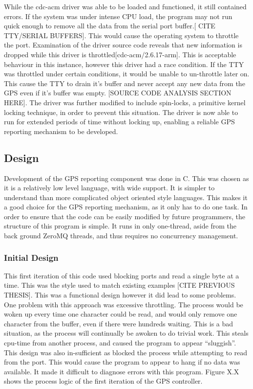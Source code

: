 While the cdc-acm driver was able to be loaded and functioned, it still contained errors. If the system was under intense CPU load, the program may not run quick enough to remove all the data from the serial port buffer.[ CITE TTY/SERIAL BUFFERS]. This would cause the operating system to throttle the port. Examination of the driver source code reveals that new information is dropped while this driver is throttled[cdc-acm/2.6.17-arm]. This is acceptable behaviour in this instance, however this driver had a race condition. If the TTY was throttled under certain conditions, it would be unable to un-throttle later on. This cause the TTY to drain it’s buffer and never accept any new data from the GPS even if it’s buffer was empty. [SOURCE CODE ANALYSIS SECTION HERE]. The driver was further modified to include spin-locks, a primitive kernel locking technique, in order to prevent this situation. The driver is now able to run for extended periods of time without locking up, enabling a reliable GPS reporting mechanism to be developed. 

\subsection {Design}

Development of the GPS reporting component was done in C. This was chosen as it is a relatively low level language, with wide support. It is simpler to understand than more complicated object oriented style languages. This makes it a good choice for the GPS reporting mechanism, as it only has to do one task. In order to ensure that the code can be easily modified by future programmers, the structure of this program is simple. It runs in only one-thread, aside from the back ground ZeroMQ threads, and thus requires no concurrency management.

\subsubsection{Initial Design}

This first iteration of this code used blocking ports and read a single byte at a time. This was the style used to match existing examples [CITE PREVIOUS THESIS]. This was a functional design however it did lead to some problems. One problem with this approach was excessive throttling. The process would be woken up every time one character could be read, and would only remove one character from the buffer, even if there were hundreds waiting. This is a bad situation, as the process will continually be awoken to do trivial work. This steals cpu-time from another process, and caused the program to appear “sluggish”. This design was also in-sufficient as blocked the process while attempting to read from the port. This would cause the program to appear to hang if no data was available. It made it difficult to diagnose errors with this program. Figure X.X shows the process logic of the first iteration of the GPS controller.

